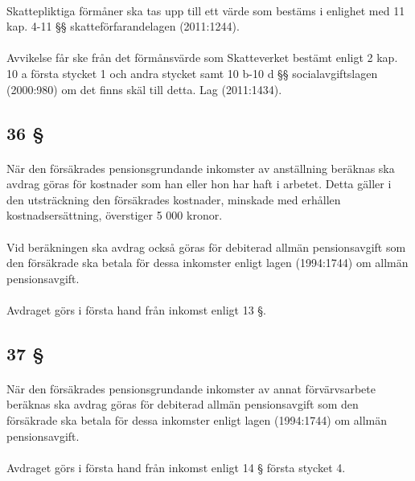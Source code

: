 \documentclass[a4paper,notitlepage,openany,10pt]{book}
\begin{document}
\paragraph*{}
Skattepliktiga förmåner ska tas upp till ett värde som bestäms i enlighet med 11 kap. 4-11 §§ skatteförfarandelagen (2011:1244).
\paragraph*{}
Avvikelse får ske från det förmånsvärde som Skatteverket bestämt enligt 2 kap. 10 a första stycket 1 och andra stycket samt 10 b-10 d §§ socialavgiftslagen (2000:980) om det finns skäl till detta.
Lag (2011:1434).
\subsection*{36 §}
\paragraph*{}
När den försäkrades pensionsgrundande inkomster av anställning beräknas ska avdrag göras för kostnader som han eller hon har haft i arbetet. Detta gäller i den utsträckning den försäkrades kostnader, minskade med erhållen kostnadsersättning, överstiger 5 000 kronor.
\paragraph*{}
Vid beräkningen ska avdrag också göras för debiterad allmän pensionsavgift som den försäkrade ska betala för dessa inkomster enligt lagen (1994:1744) om allmän pensionsavgift.
\paragraph*{}
Avdraget görs i första hand från inkomst enligt 13 §.
\subsection*{37 §}
\paragraph*{}
När den försäkrades pensionsgrundande inkomster av annat förvärvsarbete beräknas ska avdrag göras för debiterad allmän pensionsavgift som den försäkrade ska betala för dessa inkomster enligt lagen (1994:1744) om allmän pensionsavgift.
\paragraph*{}
Avdraget görs i första hand från inkomst enligt 14 § första stycket 4.
\end{document}
